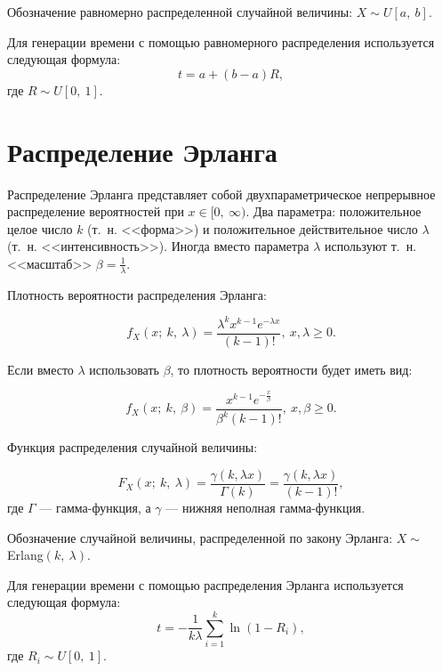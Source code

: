 \documentclass{bmstu}
\begin{document}
Обозначение равномерно распределенной случайной величины: \mbox{$X \sim U[a,~b]$}.

Для генерации времени с помощью равномерного распределения используется следующая формула:
\begin{equation}
t = a + (b - a)R,
\end{equation}
где $R \sim U[0,~1]$.

\section{Распределение Эрланга}

Распределение Эрланга представляет собой двухпараметрическое непрерывное распределение вероятностей при $x \in [0,~\infty)$. 
Два параметра: положительное целое число $k$ (т.~н. <<форма>>) и положительное действительное число $\lambda$ (т.~н. <<интенсивность>>). 
Иногда вместо параметра $\lambda$ используют т.~н. <<масштаб>> $\beta = \frac{1}{\lambda}$.

Плотность вероятности распределения Эрланга:

\begin{equation}
f_{X}(x;~k,~\lambda) = \frac{\lambda^{k} x^{k - 1} e^{-\lambda x}}{(k-1)!},~x,\lambda \geq 0.
\end{equation}

Если вместо $\lambda$ использовать $\beta$, то плотность вероятности будет иметь вид:

\begin{equation}
f_{X}(x;~k,~\beta) = \frac{x^{k - 1} e^{-\frac{x}{\beta}}}{\beta^{k} (k-1)!},~x,\beta \geq 0.
\end{equation}

Функция распределения случайной величины:

\begin{equation}
F_{X}(x;~k,~\lambda) = \frac{\gamma(k, \lambda x)}{\Gamma(k)} = \frac{\gamma(k, \lambda x)}{(k-1)!},
\end{equation}
где $\Gamma$ --- гамма-функция, а $\gamma$ --- нижняя неполная гамма-функция.

Обозначение случайной величины, распределенной по закону Эрланга: \mbox{$X \sim ${Erlang}$(k,~\lambda)$}.

Для генерации времени с помощью распределения Эрланга используется следующая формула:
\begin{equation}
t = - \frac{1}{k \lambda} \sum_{i = 1}^{k} \ln(1 - R_i),
\end{equation}
где $R_i \sim U[0,~1]$.
\end{document}

